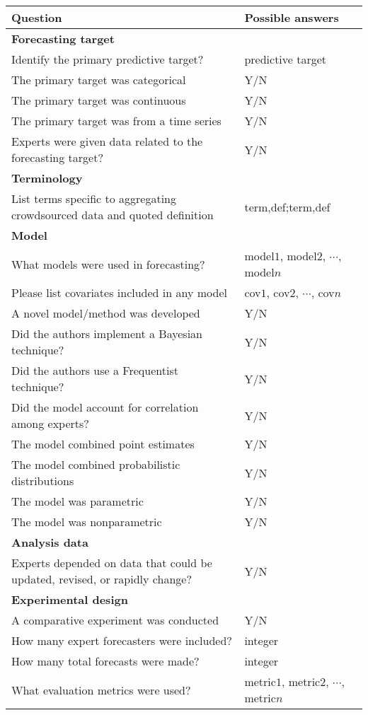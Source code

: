 \documentclass[preprint,authoryear,nonatbib]{elsarticle}
\begin{document}
\begin{table}[ht!]
  \begin{tabular}{L{9cm}L{5cm}}
    \hline
    Question & Possible answers\\
    \hline
    \textbf{Forecasting target}\\
    Identify the primary predictive target?      & predictive target\\
    The primary target was categorical           & Y/N \\
    The primary target was continuous            & Y/N \\
    The primary target was from a time series    & Y/N \\
    Experts were given data related to the forecasting target? & Y/N \\

    \textbf{Terminology}\\
    List terms specific to aggregating crowdsourced data and quoted definition & term,def;term,def\\
    
    \textbf{Model}\\
    What models were used in forecasting?        & model$1$, model$2$, $\cdots$, model$n$\\
    Please list covariates included in any model & cov$1$, cov$2$, $\cdots$, cov$n$\\
    A novel model/method was developed                   & Y/N \\
    Did the authors implement a Bayesian technique?      & Y/N \\ 
    Did the authors use a Frequentist technique?         & Y/N\\
    Did the model account for correlation among experts? & Y/N \\
    The model combined point estimates                   & Y/N \\
    The model combined probabilistic distributions       & Y/N \\
    The model was parametric                             & Y/N \\
    The model was nonparametric                          & Y/N \\ 

    \textbf{Analysis data}\\
    Experts depended on data that could be updated, revised, or rapidly change? & Y/N \\
    
    \textbf{Experimental design}\\
    A comparative experiment was conducted               & Y/N\\
    How many expert forecasters were included?           & integer\\
    How many total forecasts were made?                  & integer\\
    What evaluation metrics were used?                   & metric$1$, metric$2$, $\cdots$, metric$n$\\


\end{tabular}
\end{table}
\end{document}
